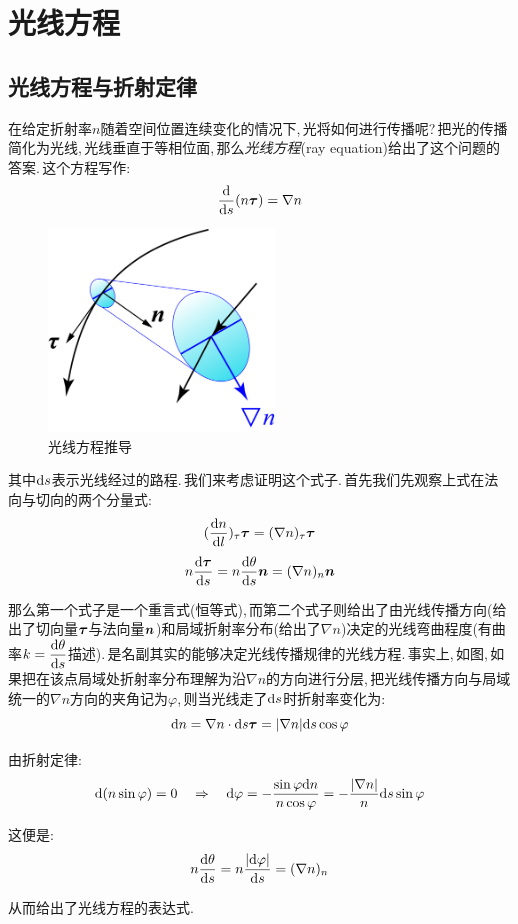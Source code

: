 \section{光线方程}

\subsection{光线方程与折射定律}
在给定折射率\(n\)随着空间位置连续变化的情况下,\,光将如何进行传播呢?\,把光的传播简化为光线,\,光线垂直于等相位面,\,那么\emph{光线方程}(ray equation)给出了这个问题的答案.\,这个方程写作:
\[\frac{\textrm{d}}{\textrm{d} s}(n\boldsymbol{\tau})=\nabla n\]

\begin{figure}
\centering
\includegraphics[width=6cm]{image/5-6-9.png}
\caption{光线方程推导}
\end{figure}
其中\(\textrm{d} s\)表示光线经过的路程.\,我们来考虑证明这个式子.\,首先我们先观察上式在法向与切向的两个分量式:
\[(\frac{\textrm{d} n}{\textrm{d} l})_\tau \boldsymbol{\tau}=(\nabla n)_\tau \boldsymbol{\tau}\]
\[n\frac{\textrm{d} \boldsymbol{\tau}}{\textrm{d} s}=n\frac{\textrm{d} \theta}{\textrm{d} s}\boldsymbol{n}=(\nabla n)_n \boldsymbol{n}\]

那么第一个式子是一个重言式(恒等式),\,而第二个式子则给出了由光线传播方向(给出了切向量\(\boldsymbol{\tau}\)与法向量\(\boldsymbol{n}\))和局域折射率分布(给出了\(\nabla n\))决定的光线弯曲程度(有曲率\(k=\dfrac{\textrm{d} \theta}{\textrm{d} s}\)描述).\,是名副其实的能够决定光线传播规律的光线方程.\,事实上,\,如图,\,如果把在该点局域处折射率分布理解为沿\(\nabla n\)的方向进行分层,\,把光线传播方向与局域统一的\(\nabla n\)方向的夹角记为\(\varphi\),\,则当光线走了\(\textrm{d} s\)时折射率变化为:
\[\textrm{d} n=\nabla n\cdot \textrm{d} s \boldsymbol{\tau}=|\nabla n|\textrm{d} s \cos\varphi\]

由折射定律:
\[\textrm{d}(n \sin\varphi)=0\quad \Rightarrow \quad \textrm{d}\varphi=-\frac{\sin\varphi\textrm{d} n}{n\cos\varphi}=-\frac{|\nabla n|}{n}\textrm{d} s\sin\varphi\]

这便是:
\[n\frac{\textrm{d} \theta}{\textrm{d} s}=n\frac{|\textrm{d} \varphi|}{\textrm{d} s}=(\nabla n)_n\]

从而给出了光线方程的表达式.

